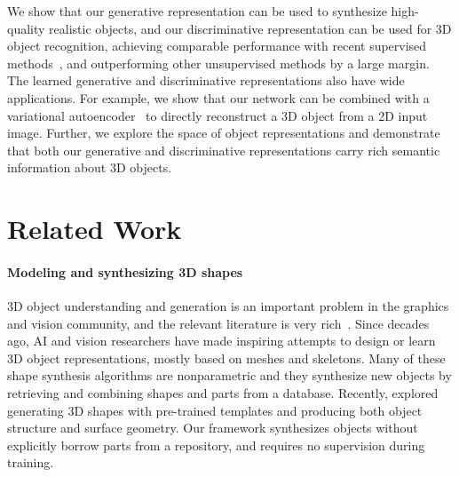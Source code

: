 \documentclass{article}
\newcommand{\presection}{\vspace{-8pt}}
\newcommand{\postsection}{\vspace{-8pt}}
\begin{document}
We show that our generative representation can be used to synthesize high-quality realistic objects, and our discriminative representation can be used for 3D object recognition, achieving comparable performance with recent supervised methods~\citep{maturana2015voxnet,shi2015deeppano}, and outperforming other unsupervised methods by a large margin. The learned generative and discriminative representations also have wide applications. For example, we show that our network can be combined with a variational autoencoder~\citep{kingma2014auto,larsen2015autoencoding} to directly reconstruct a 3D object from a 2D input image. Further, we explore the space of object representations and demonstrate that both our generative and discriminative representations carry rich semantic information about 3D objects. 

\presection
\section{Related Work}
\label{sec:related_work}
\postsection

\paragraph{Modeling and synthesizing 3D shapes}
3D object understanding and generation is an important problem in the graphics and vision community, and the relevant literature is very rich~\citep{carlson1982algorithm,tangelder2008survey,van2011survey,blanz1999morphable,kalogerakis2012probabilistic,chaudhuri2011probabilistic,xue2012example,kar2015category,bansal2016marr,wu2016single}. Since decades ago, AI and vision researchers have made inspiring attempts to design or learn 3D object representations, mostly based on meshes and skeletons. Many of these shape synthesis algorithms are nonparametric and they synthesize new objects by retrieving and combining shapes and parts from a database. Recently, \cite{huang2015analysis} explored generating 3D shapes with pre-trained templates and producing both object structure and surface geometry. Our framework synthesizes objects without explicitly borrow parts from a repository, and requires no supervision during training. 
\end{document}

